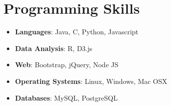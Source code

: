 \documentclass[letterpaper,11pt]{article}
\newcommand{\resumeSubHeadingListStart}{\begin{itemize}[leftmargin=*]}
\newcommand{\resumeSubHeadingListEnd}{\end{itemize}}
\begin{document}
%
\section{Programming Skills}
 \resumeSubHeadingListStart
   \item{
     \textbf{Languages}{: Java, C, Python, Javascript}
   }
   \item{
    \textbf{Data Analysis}{: R, D3.js}
   }
   \item{
     \textbf{Web}{: Bootstrap, jQuery, Node JS}
   }
   \item{
    \textbf{Operating Systems}{: Linux, Windows, Mac OSX}
   }
   \item{
    \textbf{Databases}{: MySQL, PostgreSQL}
   }
 \resumeSubHeadingListEnd


\end{document}
